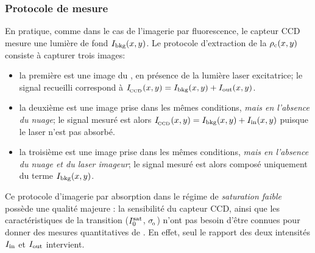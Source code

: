 \subsubsection{Protocole de mesure}
En pratique, comme dans le cas de l'imagerie par fluorescence, le capteur CCD mesure une lumière de fond ${{{I}_{\rm bkg}}(x,y)}$. Le protocole d'extraction de la \dcol ${{{\rho_{\rm{c}}}}(x,y)}$ consiste à capturer trois images:
\begin{itemize}
	\item la première est une image du \nat, en présence de la lumière laser excitatrice; le signal recueilli correspond à ${{I_{_{\hspace{-1pt}{\rm CCD}}}}(x,y)} = {{{I}_{\rm bkg}}(x,y)} + {{{I}_{\rm out}}(x,y)}$.
	\item la deuxième est une image prise dans les mêmes conditions, \emph{mais en l'absence du nuage}; le signal mesuré est alors ${{I_{_{\hspace{-1pt}{\rm CCD}}}}(x,y)} = {{{I}_{\rm bkg}}(x,y)} + {{{I}_{\rm in}}(x,y)}$ puisque le laser n'est pas absorbé.
	\item la troisième est une image prise dans les mêmes conditions, \emph{mais en l'absence du nuage et du laser imageur}; le signal mesuré est alors composé uniquement du terme ${{{I}_{\rm bkg}}(x,y)}$.
\end{itemize}
Ce protocole d'imagerie par absorption dans le régime de \emph{saturation faible} possède une qualité majeure : la sensibilité du capteur CCD, ainsi que les caractéristiques de la transition (${I^{\rm sat}_{0}}$, ${\sigma_{_{\hspace{-1pt}{0}}}}$) n'ont pas besoin d'être connues pour donner des mesures quantitatives
\footnotemark
 de \do. En effet, seul le rapport des deux intensités ${{I}_{\rm in}}$ et ${{I}_{\rm out}}$ intervient. 

\casse

